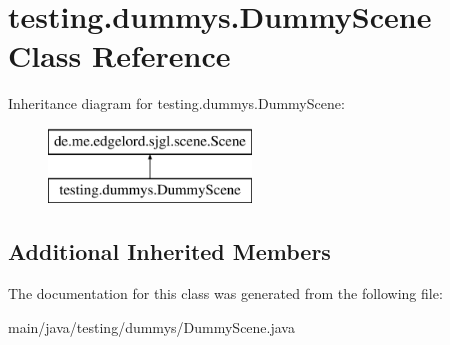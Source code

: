 \hypertarget{classtesting_1_1dummys_1_1_dummy_scene}{}\section{testing.\+dummys.\+Dummy\+Scene Class Reference}
\label{classtesting_1_1dummys_1_1_dummy_scene}
Inheritance diagram for testing.\+dummys.\+Dummy\+Scene\+:\begin{figure}[H]
\begin{center}
\leavevmode
\includegraphics[height=2.000000cm]{classtesting_1_1dummys_1_1_dummy_scene}
\end{center}
\end{figure}
\subsection*{Additional Inherited Members}


The documentation for this class was generated from the following file\+:\begin{DoxyCompactItemize}
\item 
main/java/testing/dummys/Dummy\+Scene.\+java\end{DoxyCompactItemize}
